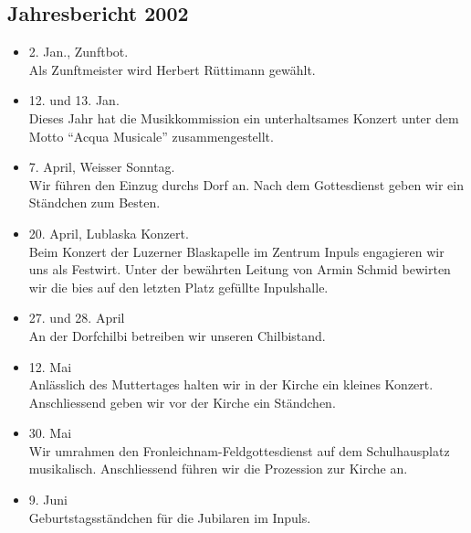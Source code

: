 \subsection{Jahresbericht 2002}

\begin{history}

    \begin{itemize}

        \item[]2. Jan., Zunftbot.\\
        Als Zunftmeister wird Herbert Rüttimann gewählt.

        \item[]12. und 13. Jan.\\
        Dieses Jahr hat die Musikkommission ein unterhaltsames Konzert unter dem
        Motto \enquote{Acqua Musicale} zusammengestellt.

        \item[]7. April, Weisser Sonntag. \\
        Wir führen den Einzug durchs Dorf an. Nach dem
        Gottesdienst geben wir ein Ständchen zum Besten.

        \item[]20. April, Lublaska Konzert.\\
        Beim Konzert der Luzerner Blaskapelle im Zentrum
        Inpuls engagieren wir uns als Festwirt. Unter der bewährten Leitung von
        Armin Schmid bewirten wir die bies auf den letzten Platz gefüllte
        Inpulshalle.

        \item[]27. und 28. April\\
        An der Dorfchilbi betreiben wir unseren Chilbistand.

        \item[]12. Mai\\
        Anlässlich des Muttertages halten wir in der Kirche ein kleines Konzert.
        Anschliessend geben wir vor der Kirche ein Ständchen.

        \item[]30. Mai\\
        Wir umrahmen den Fronleichnam-Feldgottesdienst auf dem Schulhausplatz
        musikalisch. Anschliessend führen wir die Prozession zur Kirche an.

        \item[]9. Juni\\
        Geburtstagsständchen für die Jubilaren im Inpuls.


\end{itemize}
\end{history}
